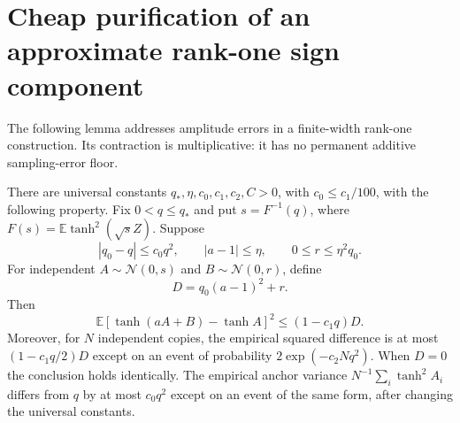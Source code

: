 \section{Cheap purification of an approximate rank-one sign component}
\label{sec:critical-purification}

The following lemma addresses amplitude errors in a finite-width
rank-one construction. Its contraction is multiplicative: it has no
permanent additive sampling-error floor.

\begin{lemma}
\label{lem:critical-purification-step}
There are universal constants $q_*,\eta,c_0,c_1,c_2,C>0$, with
$c_0\le c_1/100$, with the following
property. Fix $0<q\le q_*$ and put $s=F^{-1}(q)$, where
$F(s)=\mathbb E\tanh^2(\sqrt sZ)$. Suppose
\[
 |q_0-q|\le c_0 q^2,\qquad
 |a-1|\le\eta,\qquad 0\le r\le\eta^2q_0.
\]
For independent $A\sim\mathcal N(0,s)$ and
$B\sim\mathcal N(0,r)$, define
\[
 D=q_0(a-1)^2+r.
\]
Then
\[
 \mathbb E[\tanh(aA+B)-\tanh A]^2\le(1-c_1q)D.
\]
Moreover, for $N$ independent copies, the empirical squared difference
is at most $(1-c_1q/2)D$ except on an event of probability
$2\exp(-c_2Nq^2)$. When $D=0$ the conclusion holds identically.
The empirical anchor variance $N^{-1}\sum_i\tanh^2 A_i$ differs
from $q$ by at most $c_0q^2$ except on an event of the same form, after
changing the universal constants.
\end{lemma}

